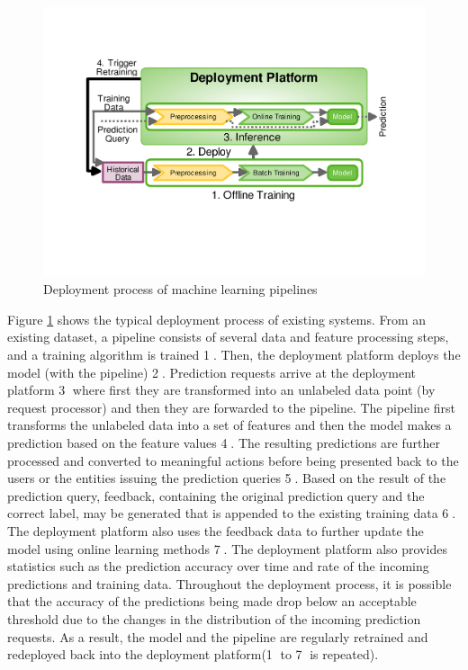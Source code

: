 \begin{figure}[h!]
\centering
\includegraphics[width=\columnwidth]{../images/generic-motivational-example-v2.pdf}
\caption{Deployment process of machine learning pipelines}
\label{fig:motivational-example}
\end{figure}

Figure \ref{fig:motivational-example} shows the typical deployment process of existing systems.
From an existing dataset, a pipeline consists of several data and feature processing steps, and a training algorithm is trained \textcircled{1}.
Then, the deployment platform deploys the model (with the pipeline) \textcircled{2}.
Prediction requests arrive at the deployment platform \textcircled{3} where first they are transformed into an unlabeled data point (by request processor) and then they are forwarded to the pipeline.
The pipeline first transforms the unlabeled data into a set of features and then the model makes a prediction based on the feature values  \textcircled{4}.
The resulting predictions are further processed and converted to meaningful actions before being presented back to the users or the entities issuing the prediction queries \textcircled{5}.
Based on the result of the prediction query, feedback, containing the original prediction query and the correct label, may be generated that is appended to the existing training data \textcircled{6}.
The deployment platform also uses the feedback data to further update the model using online learning methods \textcircled{7}.
The deployment platform also provides statistics such as the prediction accuracy over time and rate of the incoming predictions and training data.
Throughout the deployment process, it is possible that the accuracy of the predictions being made drop below an acceptable threshold due to the changes in the distribution of the incoming prediction requests.
As a result, the model and the pipeline are regularly retrained and redeployed back into the deployment platform(\textcircled{1} to \textcircled{7} is repeated).

